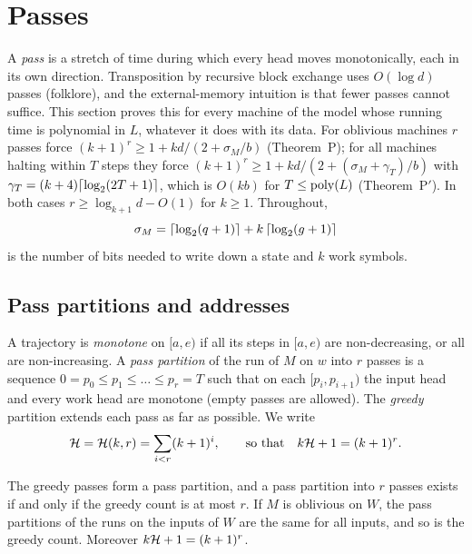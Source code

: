 \section{Passes}\label{sec:passes}

A \emph{pass} is a stretch of time during which every head moves monotonically, each in its own
direction. Transposition by recursive block exchange uses $O(\log d)$ passes (folklore), and the
external-memory intuition is that fewer passes cannot suffice. This section proves this for every
machine of the model whose running time is polynomial in $L$, whatever it does with its data. For
oblivious machines $r$ passes force $(k+1)^r\ge1+kd/(2+\sigma_M/b)$ (Theorem~P); for all machines
halting within $T$ steps they force $(k+1)^r\ge1+kd/(2+(\sigma_M+\gamma_T)/b)$ with
$\gamma_T=(k+4)\lceil \log_2 (2T+1) \rceil$, which is $O(kb)$ for $T\le\operatorname{poly}(L)$ (Theorem~P$'$). In both cases
$r\ge\log_{k+1}d-O(1)$ for $k\ge1$. Throughout,
\[
  \sigma_M=\lceil \log_2 (q+1) \rceil+k\,\lceil \log_2 (g+1) \rceil
\]
is the number of bits needed to write down a state and $k$ work symbols.

\subsection{Pass partitions and addresses}

\begin{definition}[Passes]\label{def:passes}
A trajectory is \emph{monotone} on $[a,e)$ if all its steps in $[a,e)$ are non-decreasing, or all
are non-increasing. A \emph{pass partition} of the run of $M$ on $w$ into $r$ passes is a sequence
$0=p_0\le p_1\le\dots\le p_r=T$ such that on each $[p_i,p_{i+1})$ the input head and every work
head are monotone (empty passes are allowed). The \emph{greedy} partition extends each pass as far
as possible. We write
\[
  \mathcal{H}=\mathcal{H}(k,r)=\sum_{i<r}(k+1)^i ,\qquad\text{so that}\quad k\mathcal{H}+1=(k+1)^r .
\]
\end{definition}

\begin{lemma}\label{lem:greedy}
The greedy passes form a pass partition, and a pass partition into $r$ passes exists if and only
if the greedy count is at most $r$. If $M$ is oblivious on $W$, the pass partitions of the runs on
the inputs of $W$ are the same for all inputs, and so is the greedy count. Moreover $k\mathcal{H}+1=(k+1)^r$.
\end{lemma}

